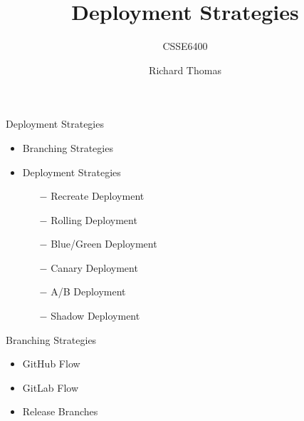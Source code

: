 \documentclass{slide}
\title{Deployment Strategies}
\subtitle{CSSE6400}
\author{Richard Thomas}
\date{\week{12}}
\begin{document}
\maketitle

\begin{frame}{Deployment Strategies}
  \vspace{1pt}
  {\huge
    \begin{itemize}
        \item Branching Strategies
        \vspace{8pt}
        \item Deployment Strategies
	    \begin{itemize}
	        \LARGE\item[$-$] Recreate Deployment
	        \LARGE\item[$-$] Rolling Deployment
	        \LARGE\item[$-$] Blue/Green Deployment
	        \LARGE\item[$-$] Canary Deployment
	        \LARGE\item[$-$] A/B Deployment
	        \LARGE\item[$-$] Shadow Deployment
	    \end{itemize}
    \end{itemize}
  }
\end{frame}


\begin{frame}{Branching Strategies}
  \vspace{1pt}
  {\huge{
    \begin{itemize}
        \item GitHub Flow
        \item GitLab Flow
        \item Release Branches
    \end{itemize}
  }}
\end{frame}
\end{document}
